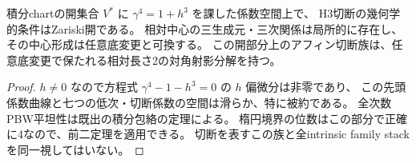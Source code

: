 \begin{corollary}
\label{cor:integrated-order4-relative-open}
積分chartの開集合 $V^*$ に $\gamma^4=1+h^3$ を課した係数空間上で、
H3切断の幾何学的条件はZariski開である。
相対中心の三生成元・三次関係は局所的に存在し、その中心形成は任意底変更と可換する。
この開部分上のアフィン切断族は、任意底変更で保たれる相対長さ2の対角射影分解を持つ。
\end{corollary}
\begin{proof}
$h\ne0$ なので方程式 $\gamma^4-1-h^3=0$ の $h$ 偏微分は非零であり、
この先頭係数曲線と七つの低次・切断係数の空間は滑らか、特に被約である。
全次数PBW平坦性は既出の積分包絡の定理による。
楕円境界の位数はこの部分で正確に4なので、前二定理を適用できる。
切断を表すこの族と全intrinsic family stackを同一視してはいない。
\end{proof}
